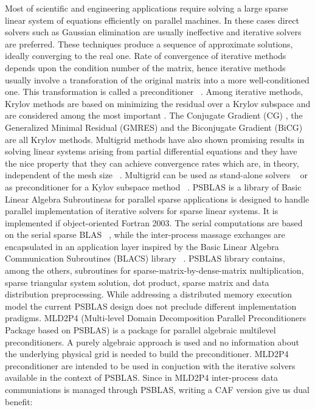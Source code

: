 \documentclass{IOS-Book-Article}
\begin{document}
Most of scientific and engineering applications require solving a large sparse linear system of equations efficiently on parallel machines.  
In these cases direct solvers such as Gaussian elimination are usually ineffective and iterative solvers are preferred.
These techniques produce a sequence of approximate solutions, ideally converging to the real one. Rate of convergence of iterative methods depends upon the condition number of the matrix, hence iterative methods usually involve a transforation of the original matrix into a more well-conditioned one. This transformation is called a preconditioner ~\cite{barrett1994templates}. Among iterative methods, Krylov methods are based on minimizing the residual over a Krylov subspace and are considered among the most important \cite{ipsen1998idea}. The Conjugate Gradient (CG) \cite{shewchuk1994introduction}, the Generalized Minimal Residual (GMRES) \cite{saad1986gmres} and the Biconjugate Gradient (BiCG) \cite{van1992bi} are all Krylov methods. 
Multigrid methods have also shown promising results in solving linear systems arising from partial differential equations and they have the nice property that they can achieve convergence rates which are, in theory, independent of the mesh size ~\cite{saad2003iterative}.
Multigrid can be used as stand-alone solvers ~\cite{brandt1977multi} or as preconditioner for a Kylov subspace method ~\cite{bramble1990parallel}.
PSBLAS is a library of Basic Linear Algebra Subroutineas for parallel sparse applications is designed to handle parallel implementation of iterative solvers for sparse linear systems. It is implemented if object-oriented Fortran 2003. The serial computations are based on the serial sparse BLAS ~\cite{duff2002overview}, while the inter-process massage exchanges are encapsulated in an application layer inspired by the Basic Linear Algebra Communication Subroutines (BLACS) library ~\cite{whaley1997user}. PSBLAS library contains, among the others, subroutines for sparse-matrix-by-dense-matrix multiplication, sparse triangular system solution, dot product, sparse matrix and data distribution preprocessing.
While addressing a distributed memory execution model the current PSBLAS design does not preclude different implementation pradigms.
MLD2P4 (Multi-level Domain Decomposition Parallel Preconditioners Package based on PSBLAS) is a package for parallel algebraic multilevel preconditioners. A purely algebraic approach is used and no information about the underlying physical grid is needed to build the preconditioner. MLD2P4 preconditioner are intended to be used in conjuction with the iterative solvers available in the context of PSBLAS. 
Since in MLD2P4 inter-process data communiations is managed through PSBLAS, writing a CAF version give us dual benefit:
\end{document}
